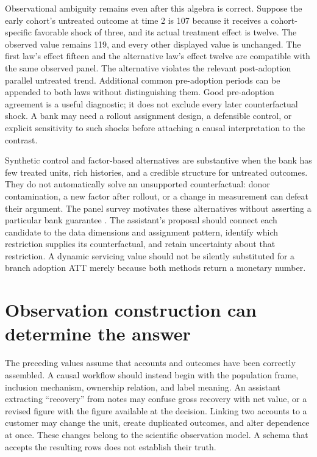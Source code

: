 Observational ambiguity remains even after this algebra is correct. Suppose
the early cohort's untreated outcome at time 2 is 107 because it receives a
cohort-specific favorable shock of three, and its actual treatment effect
is twelve. The observed value remains 119, and every other displayed value is
unchanged. The first law's effect fifteen and the alternative law's effect
twelve are compatible with the same observed panel. The alternative violates
the relevant post-adoption parallel untreated trend. Additional common
pre-adoption periods can be appended to both laws without distinguishing
them. Good pre-adoption agreement is a useful diagnostic; it does not exclude
every later counterfactual shock. A bank may need a rollout assignment design,
a defensible control, or explicit sensitivity to such shocks before attaching
a causal interpretation to the contrast.

Synthetic control and factor-based alternatives are substantive when the
bank has few treated units, rich histories, and a credible structure for
untreated outcomes. They do not automatically solve an unsupported
counterfactual: donor contamination, a new factor after rollout, or a change
in measurement can defeat their argument. The panel survey motivates these
alternatives without asserting a particular bank guarantee
\cite{panelreview2024}. The assistant's proposal should connect each candidate
to the data dimensions and assignment pattern, identify which restriction
supplies its counterfactual, and retain uncertainty about that restriction.
A dynamic servicing value should not be silently substituted for a branch
adoption ATT merely because both methods return a monetary number.

\section{Observation construction can determine the answer}
\label{exec14:l5-observations}

The preceding values assume that accounts and outcomes have been correctly
assembled. A causal workflow should instead begin with the population frame,
inclusion mechanism, ownership relation, and label meaning. An assistant
extracting ``recovery'' from notes may confuse gross recovery with net value,
or a revised figure with the figure available at the decision. Linking two
accounts to a customer may change the unit, create duplicated outcomes, and
alter dependence at once. These changes belong to the scientific observation
model. A schema that accepts the resulting rows does not establish their truth.

